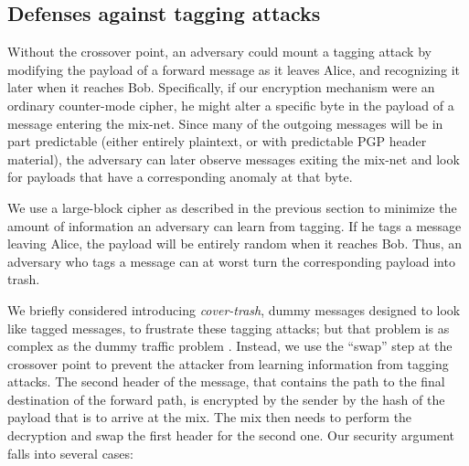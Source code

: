 \documentclass[11pt]{IEEEtran}
\begin{document}
\subsection{Defenses against tagging attacks}
\label{subsec:tagging-defenses}

Without the crossover point, an adversary could mount a tagging
attack by modifying the payload of a forward message as
it leaves Alice, and recognizing it later when it reaches Bob.
Specifically, if our encryption mechanism were an ordinary
counter-mode cipher, he might alter a specific byte in the payload of
a message entering the mix-net. Since many of the outgoing messages
will be in part predictable (either entirely plaintext, or with
predictable PGP header material), the adversary can later observe
messages exiting the mix-net and look for payloads that have a
corresponding anomaly at that byte.


We use a large-block cipher as described in the previous section to
minimize the amount of information an adversary can learn from tagging.
If he tags a message
leaving Alice, the payload will be entirely random when it reaches
Bob.  Thus, an adversary who tags a message can at worst turn the
corresponding payload into trash.  

We briefly considered introducing \emph{cover-trash}, dummy messages
designed to look like tagged messages, to frustrate
these tagging attacks; but that problem is as complex as the dummy
traffic problem \cite{langos02}. Instead, we use the
``swap'' step at the
crossover point to prevent the attacker from learning information from
tagging attacks. The second header of the message, that contains the
path to the final destination of the forward path,  is encrypted by the
sender by the hash of the payload that is to arrive at the mix. The
mix then needs to perform the decryption and swap the first header for
the second one.
Our security argument falls into several cases:
\end{document}
